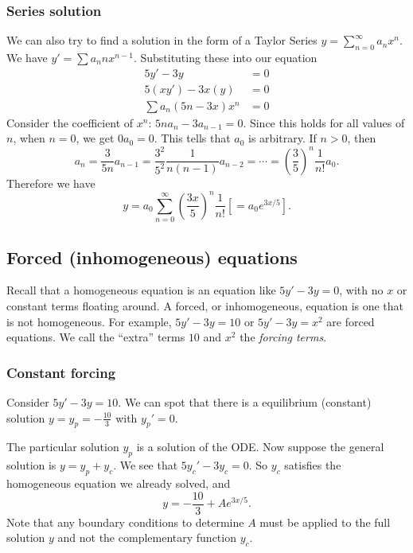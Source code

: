 \documentclass[a4paper]{article}
\begin{document}
\subsubsection*{Series solution}
We can also try to find a solution in the form of a Taylor Series $y = \sum\limits_{n=0}^\infty a_nx^n$. We have $y' = \sum a_nnx^{n-1}$. Substituting these into our equation
\begin{align*}
  5y' - 3y &= 0\\
  5(xy') - 3x(y) &= 0\\
  \sum a_n(5n - 3x)x^n &= 0
\end{align*}
Consider the coefficient of $x^n$: $5n a_n - 3 a_{n-1} = 0$. Since this holds for all values of $n$, when $n = 0$, we get $0a_0 = 0$. This tells that $a_0$ is arbitrary. If $n>0$, then
\[
  a_n = \frac{3}{5n}a_{n-1} = \frac{3^2}{5^2}\frac{1}{n(n-1)}a_{n-2} = \cdots = \left(\frac{3}{5}\right)^n \frac{1}{n!}a_0.
\]
Therefore we have
\[
  y = a_0\sum_{n = 0}^\infty \left(\frac{3x}{5}\right)^n\frac{1}{n!} \left[= a_0 e^{3x/5}\right].
\]

\subsection{Forced (inhomogeneous) equations}
Recall that a homogeneous equation is an equation like $5y' - 3y = 0$, with no $x$ or constant terms floating around. A forced, or inhomogeneous, equation is one that is not homogeneous. For example, $5y' - 3y = 10$ or $5y' - 3y = x^2$ are forced equations. We call the ``extra'' terms $10$ and $x^2$ the \emph{forcing terms}.

\subsubsection{Constant forcing}

\begin{eg}
  Consider $5y' - 3y = 10$. We can spot that there is a equilibrium (constant) solution $y = y_p = -\frac{10}{3}$ with $y_p' = 0$.

  The particular solution $y_p$ is a solution of the ODE. Now suppose the general solution is $y = y_p + y_c$. We see that $5y_c' - 3y_c = 0$. So $y_c$ satisfies the homogeneous equation we already solved, and
  \[
    y = -\frac{10}{3} + Ae^{3x/5}.
  \]
  Note that any boundary conditions to determine $A$ must be applied to the full solution $y$ and not the complementary function $y_c$.
\end{eg}
\end{document}
